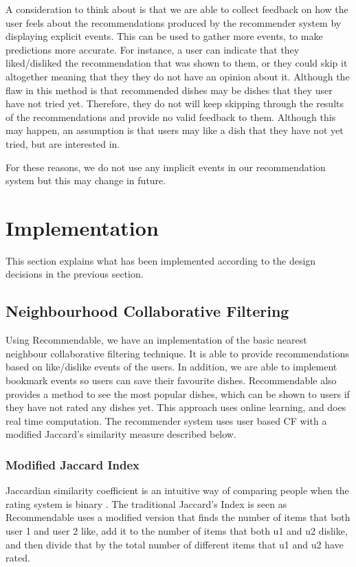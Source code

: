 A consideration to think about is that we are able to collect feedback on how the user feels about the recommendations produced by the recommender system by displaying explicit events. This can be used to gather more events, to make predictions more accurate. For instance, a user can indicate that they liked/disliked the recommendation that was shown to them, or they could skip it altogether meaning that they they do not have an opinion about it. Although the flaw in this method is that recommended dishes may be dishes that they user have not tried yet. Therefore, they do not will keep skipping through the results of the recommendations and provide no valid feedback to them. Although this may happen, an assumption is that users may like a dish that they have not yet tried, but are interested in. 

For these reasons, we do not use any implicit events in our recommendation system but this may change in future. 

\section{Implementation}

This section explains what has been implemented according to the design decisions in the previous section. 

\subsection{Neighbourhood Collaborative Filtering}

Using Recommendable, we have an implementation of the basic nearest neighbour collaborative filtering technique. It is able to provide recommendations based on like/dislike events of the users. In addition, we are able to implement bookmark events so users can save their favourite dishes. Recommendable also provides a method to see the most popular dishes, which can be shown to users if they have not rated any dishes yet. This approach uses online learning, and does real time computation. The recommender system uses user based CF with a modified Jaccard's similarity measure described below.

\subsubsection{Modified Jaccard Index}

Jaccardian similarity coefficient is an intuitive way of comparing people when the rating system is binary \cite{recommendable}. The traditional Jaccard's Index is seen as  Recommendable uses a modified version that finds the number of items that both user 1 and user 2 like, add it to the number of items that both u1 and u2 dislike, and then divide that by the total number of different items that u1 and u2 have rated.

